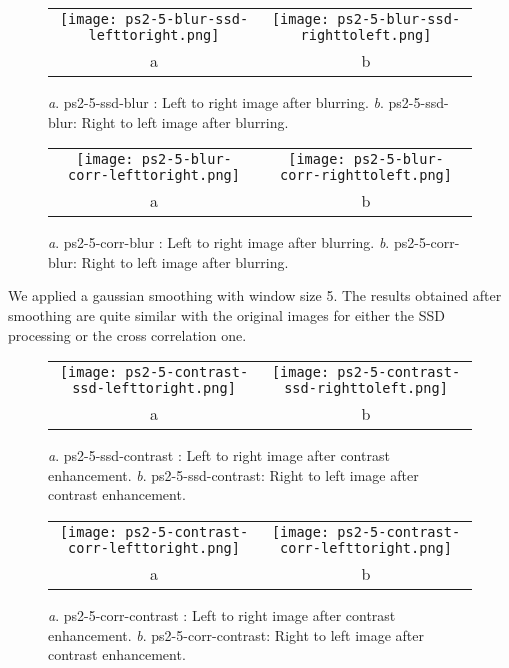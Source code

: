 \documentclass[a4paper,11pt]{article}
\begin{document}


\begin{figure}[H]
\begin{center}
\begin{tabular}{cc}
	\texttt{[image: ps2-5-blur-ssd-lefttoright.png]}&
	\texttt{[image: ps2-5-blur-ssd-righttoleft.png]}\\
	a&b
\end{tabular}
\end{center}
\caption{ 
\textit{a}. ps2-5-ssd-blur : Left to right image after blurring.  \textit{b}. ps2-5-ssd-blur: Right to left image after blurring. }
\label{ps2-1}
\end{figure}


 \begin{figure}[H]
\begin{center}
\begin{tabular}{cc}
	\texttt{[image: ps2-5-blur-corr-lefttoright.png]}&
	\texttt{[image: ps2-5-blur-corr-righttoleft.png]}\\
	a&b
\end{tabular}
\end{center}
\caption{ 
\textit{a}. ps2-5-corr-blur : Left to right image after blurring.  \textit{b}. ps2-5-corr-blur: Right to left image after blurring. }
\label{ps2-1}
\end{figure}

We applied a gaussian smoothing with window size 5.
The results obtained after smoothing are quite similar with the original images for either the SSD processing or the cross correlation one.

\begin{figure}[H]
\begin{center}
\begin{tabular}{cc}
	\texttt{[image: ps2-5-contrast-ssd-lefttoright.png]}&
	\texttt{[image: ps2-5-contrast-ssd-righttoleft.png]}\\
	a&b
\end{tabular}
\end{center}
\caption{ 
\textit{a}. ps2-5-ssd-contrast : Left to right image after contrast enhancement.  \textit{b}. ps2-5-ssd-contrast: Right to left image after contrast enhancement. }
\label{ps2-1}
\end{figure}


 \begin{figure}[H]
\begin{center}
\begin{tabular}{cc}
	\texttt{[image: ps2-5-contrast-corr-lefttoright.png]}&
	\texttt{[image: ps2-5-contrast-corr-lefttoright.png]}\\
	a&b
\end{tabular}
\end{center}
\caption{ 
\textit{a}. ps2-5-corr-contrast : Left to right image after contrast enhancement.  \textit{b}. ps2-5-corr-contrast: Right to left image after contrast enhancement. }
\label{ps2-1}
\end{figure}
\end{document}
